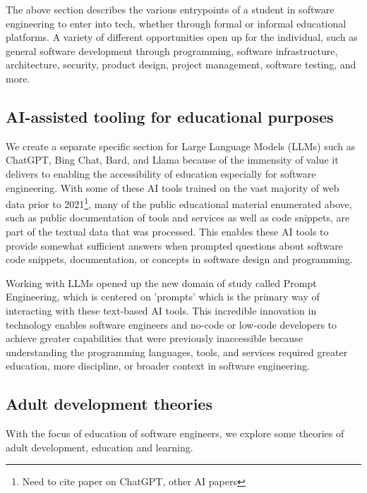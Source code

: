 \documentclass[conference]{IEEEtran}
\newcommand{\tomegg}{
  \href{http://tome.gg}{Tome.gg}
}
\begin{document}
The above section describes the various entrypoints of a student in software engineering
to enter into tech, whether through formal or informal educational platforms. A variety
of different opportunities open up for the individual, such as general software 
development through programming, software infrastructure, architecture, security,
product design, project management, software testing, and more.

\subsection{AI-assisted tooling for educational purposes}

We create a separate specific section for Large Language Models (LLMs) such as 
ChatGPT, Bing Chat, Bard, and Llama because of the immensity of value it delivers
to enabling the accessibility of education especially for software engineering. 
With some of these AI tools trained on the  vast majority of web data prior to 2021\footnote{Need to cite paper on ChatGPT, 
other AI papers}, many of the public educational material enumerated above, such 
as public documentation of tools and services as well as code snippets, are 
part of the textual data that was processed. This enables these AI tools to provide
somewhat sufficient answers when prompted questions about software code snippets, 
documentation, or concepts in software design and programming.

Working with LLMs  opened up the new domain of study called Prompt Engineering,
which is centered on 'prompts' which is the primary way of interacting with these
text-based AI tools. This incredible innovation in technology enables software engineers and 
no-code or low-code developers to achieve greater capabilities that were 
previously inaccessible because understanding the programming languages, tools,
and services required greater education, more discipline, or broader context 
in software engineering.

\subsection{Adult development theories}

With the focus of education of software engineers, we explore some theories of 
adult development, education and learning.

\end{document}
